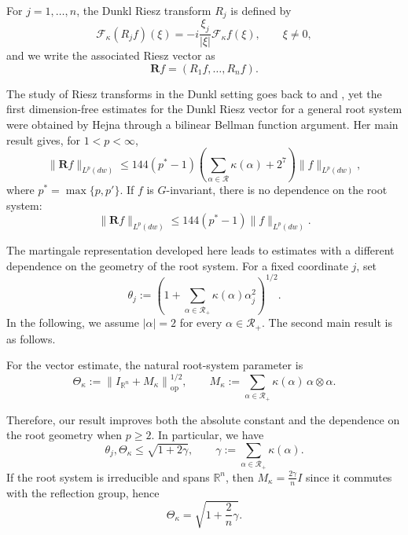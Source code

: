 \documentclass[11pt]{amsart}
\newtheorem{atheorem}{Theorem}
\theoremstyle{definition}
\theoremstyle{remark}
\numberwithin{equation}{section}
\newcommand{\R}{\mathbb{R}}
\newcommand{\RR}{\mathcal{R}}
\begin{document}
For $j=1,\ldots,n$, the Dunkl Riesz transform $R_j$ is defined by
\[
\mathcal F_\kappa(R_jf)(\xi)
=
-i\frac{\xi_j}{|\xi|}
\mathcal F_\kappa f(\xi),
\qquad \xi\neq0,
\]
and we write the associated Riesz vector as
\[
\mathbf Rf=(R_1f,\ldots,R_nf).
\]

The study of Riesz transforms in the Dunkl setting goes back to \cite{thangxu} and \cite{amsi}, yet the first dimension-free estimates for the Dunkl Riesz vector for a general root system were obtained by Hejna \cite{Dimensionless} through a bilinear Bellman function argument. Her main result gives, for $1<p<\infty$,
\[
\|\mathbf Rf\|_{L^p(dw)}
\leq
144(p^*-1)
\left(
\sum_{\alpha\in\RR}\kappa(\alpha)+2^7
\right)
\|f\|_{L^p(dw)},
\]
where $p^*=\max\{p,p'\}$. If $f$ is $G$-invariant, there is no dependence on the root system:
\[
\|\mathbf Rf\|_{L^p(dw)}
\leq
144(p^*-1)\|f\|_{L^p(dw)}.
\]

The martingale representation developed here leads to estimates with a different dependence on the geometry of the root system. For a fixed coordinate $j$, set
\[
\theta_j
:=
\left(
1+
\sum_{\alpha\in\RR_+}
\kappa(\alpha)\alpha_j^2
\right)^{1/2}.
\]
In the following, we assume $|\alpha|=2$ for every $\alpha \in \RR_+$. The second main result is as follows.

For the vector estimate, the natural root-system parameter is
\[
\Theta_\kappa
:=
\left\|
I_{\R^n}+M_\kappa
\right\|_{\mathrm{op}}^{1/2},
\qquad
M_\kappa:=\sum_{\alpha\in\RR_+}
\kappa(\alpha)\,\alpha\otimes\alpha.
\]



Therefore, our result improves both the absolute constant and the dependence on the root geometry when $p\geq2$. In particular, we have
\[
\theta_j,\Theta_\kappa\leq\sqrt{1+2\gamma},
\qquad
\gamma:=\sum_{\alpha\in\RR_+}\kappa(\alpha).
\]
If the root system is irreducible and spans $\R^n$, then $M_\kappa=\frac{2\gamma}{n}I$ since it commutes with the reflection group, hence
\[
\Theta_\kappa=\sqrt{1+\frac{2}{n}\gamma}.
\]
\end{document}
